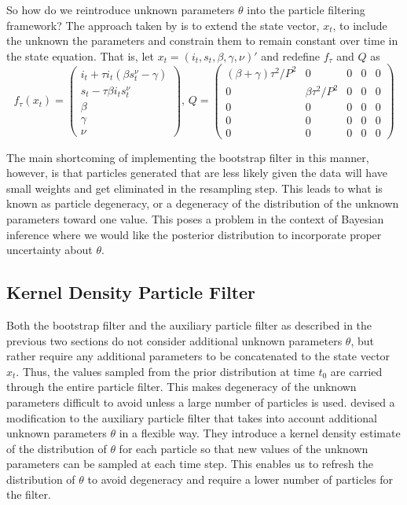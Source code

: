 \documentclass{article}
\begin{document}
So how do we reintroduce unknown parameters $\theta$ into the particle filtering framework?  The approach taken by \citet{skvortsov2012monitoring} is to extend the state vector, $x_t$, to include the unknown the parameters and constrain them to remain constant over time in the state equation.  That is, let $x_t = (i_t,s_t,\beta,\gamma,\nu)'$ and redefine $f_\tau$ and $Q$ as
\[
f_\tau(x_t) = \left(
\begin{array}{c}
i_t + \tau i_t(\beta s^{\nu}_t - \gamma) \\
s_t - \tau\beta i_ts^{\nu}_t \\
\beta \\
\gamma \\
\nu
\end{array}
\right)
\mbox{, }
Q = \left(
\begin{array}{ccccc}
(\beta + \gamma)\tau^2/P^2 & 0 & 0 & 0 & 0 \\
0 & \beta\tau^2/P^2 & 0 & 0 & 0 \\
0 & 0 & 0 & 0 & 0 \\
0 & 0 & 0 & 0 & 0 \\
0 & 0 & 0 & 0 & 0
\end{array}
\right)
 \]

\noindent The main shortcoming of implementing the bootstrap filter in this manner, however, is that particles generated that are less likely given the data will have small weights and get eliminated in the resampling step.  This leads to what is known as particle degeneracy, or a degeneracy of the distribution of the unknown parameters toward one value.  This poses a problem in the context of Bayesian inference where we would like the posterior distribution to incorporate proper uncertainty about $\theta$.

\subsection{Kernel Density Particle Filter}

Both the bootstrap filter and the auxiliary particle filter as described in the previous two sections do not consider additional unknown parameters $\theta$, but rather require any additional parameters to be concatenated to the state vector $x_t$.  Thus, the values sampled from the prior distribution at time $t_0$ are carried through the entire particle filter.  This makes degeneracy of the unknown parameters difficult to avoid unless a large number of particles is used.  \citet{Liu:West:comb:2001} devised a modification to the auxiliary particle filter that takes into account additional unknown parameters $\theta$ in a flexible way.  They introduce a kernel density estimate of the distribution of $\theta$ for each particle so that new values of the unknown parameters can be sampled at each time step.  This enables us to refresh the distribution of $\theta$ to avoid degeneracy and require a lower number of particles for the filter.
\end{document}
